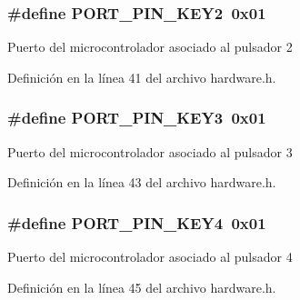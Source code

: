 \subsubsection[{\texorpdfstring{P\+O\+R\+T\+\_\+\+P\+I\+N\+\_\+\+K\+E\+Y2}{PORT_PIN_KEY2}}]{\setlength{\rightskip}{0pt plus 5cm}\#define P\+O\+R\+T\+\_\+\+P\+I\+N\+\_\+\+K\+E\+Y2~0x01}\hypertarget{group__hardware_ga2cc4114181749a25732e31ed271a1f6b}{}\label{group__hardware_ga2cc4114181749a25732e31ed271a1f6b}
Puerto del microcontrolador asociado al pulsador 2 

Definición en la línea 41 del archivo hardware.\+h.

\subsubsection[{\texorpdfstring{P\+O\+R\+T\+\_\+\+P\+I\+N\+\_\+\+K\+E\+Y3}{PORT_PIN_KEY3}}]{\setlength{\rightskip}{0pt plus 5cm}\#define P\+O\+R\+T\+\_\+\+P\+I\+N\+\_\+\+K\+E\+Y3~0x01}\hypertarget{group__hardware_ga5f697895be4580f403de4a9f75ab8a3b}{}\label{group__hardware_ga5f697895be4580f403de4a9f75ab8a3b}
Puerto del microcontrolador asociado al pulsador 3 

Definición en la línea 43 del archivo hardware.\+h.

\subsubsection[{\texorpdfstring{P\+O\+R\+T\+\_\+\+P\+I\+N\+\_\+\+K\+E\+Y4}{PORT_PIN_KEY4}}]{\setlength{\rightskip}{0pt plus 5cm}\#define P\+O\+R\+T\+\_\+\+P\+I\+N\+\_\+\+K\+E\+Y4~0x01}\hypertarget{group__hardware_gac86eb82e082d51cc0d4b0a87680cd7da}{}\label{group__hardware_gac86eb82e082d51cc0d4b0a87680cd7da}
Puerto del microcontrolador asociado al pulsador 4 

Definición en la línea 45 del archivo hardware.\+h.

